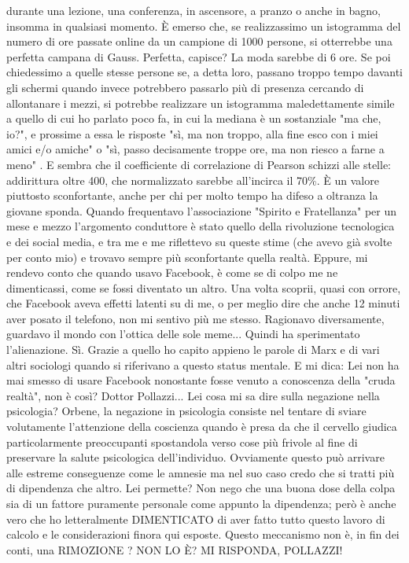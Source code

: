\documentclass[a4paper,12pt]{article}
\newcommand{\Walter}{\speak{W}}
\newcommand{\Pollazzi}{\speak{P}}
\begin{document}
\begin{dialogue}
durante una lezione, una conferenza, in ascensore, a pranzo o anche in bagno,
insomma in qualsiasi momento. È emerso che, se realizzassimo un istogramma del
numero di ore passate online da un campione di 1000 persone, si otterrebbe una
perfetta campana di Gauss. Perfetta, capisce? La moda sarebbe di 6 ore. Se poi
chiedessimo a quelle stesse persone se, a detta loro, passano troppo tempo
davanti gli schermi quando invece potrebbero passarlo più di presenza cercando
di allontanare i mezzi, si potrebbe realizzare un istogramma maledettamente
simile a quello di cui ho parlato poco fa, in cui la mediana è un sostanziale
"ma che, io?", e prossime a essa le risposte "sì, ma non troppo, alla fine esco
con i miei amici e/o amiche" o "sì, passo decisamente troppe ore, ma non riesco
a farne a meno" . E sembra che il coefficiente di correlazione di Pearson
schizzi alle stelle: addirittura oltre 400, che normalizzato sarebbe all'incirca
il 70\%. È un valore piuttosto sconfortante, anche per chi per molto tempo ha difeso a oltranza la giovane sponda. Quando frequentavo l'associazione "Spirito e Fratellanza" per un mese e mezzo l'argomento conduttore è stato quello della rivoluzione tecnologica e dei social media, e tra me e me riflettevo su queste stime (che avevo già svolte per conto mio) e trovavo sempre più sconfortante quella realtà. Eppure, mi rendevo conto che quando usavo Facebook, è come se di colpo me ne dimenticassi, come se fossi diventato un altro. Una volta scoprii, quasi con orrore, che Facebook aveva effetti latenti su di me, o per meglio dire che anche 12 minuti aver posato il telefono,
non mi sentivo più me stesso. Ragionavo diversamente, guardavo il mondo con l'ottica delle sole meme...
\Pollazzi Quindi ha sperimentato l'alienazione.
\Walter  Sì. Grazie a quello ho capito appieno le parole di Marx e di vari altri sociologi quando si riferivano a questo status mentale.
\Pollazzi E mi dica: Lei non ha mai smesso di usare Facebook nonostante fosse venuto a conoscenza della "cruda realtà", non è così?
\Walter  Dottor Pollazzi... Lei cosa mi sa dire sulla negazione nella psicologia?
\Pollazzi Orbene, la negazione in psicologia consiste nel tentare di sviare volutamente l'attenzione della coscienza quando è presa da che il cervello giudica particolarmente preoccupanti spostandola verso cose più frivole al fine di preservare la salute psicologica dell'individuo. Ovviamente questo può arrivare alle estreme conseguenze come le amnesie ma nel suo caso credo che si tratti più di dipendenza che altro.
\Walter  Lei permette? Non nego che una buona dose della colpa sia di un fattore puramente personale come appunto la dipendenza; però è anche vero che ho letteralmente DIMENTICATO  di aver fatto tutto questo lavoro di calcolo e le considerazioni finora qui esposte. Questo meccanismo non è, in fin dei conti, una RIMOZIONE ? NON LO È? MI RISPONDA, POLLAZZI!

\end{dialogue}
\end{document}
